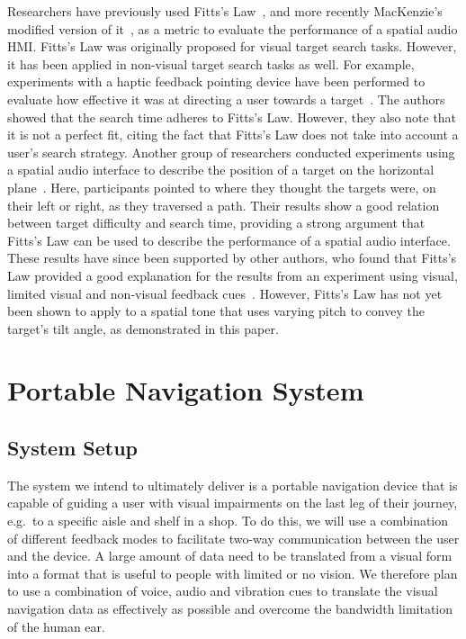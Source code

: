 \documentclass[sigconf, review=true, screen=true, anonymous=true]{acmart}
\begin{document}
Researchers have previously used Fitts's Law~\cite{fitts1954information}, and more recently MacKenzie's modified version of it~\cite{mackenzie1992fitts}, as a metric to evaluate the performance of a spatial audio HMI\@.
Fitts's Law was originally proposed for visual target search tasks.
However, it has been applied in non-visual target search tasks as well.
For example, experiments with a haptic feedback pointing device have been performed to evaluate how effective it was at directing a user towards a target~\cite{ahmaniemi2009augmented}.
The authors showed that the search time adheres to Fitts's Law.
However, they also note that it is not a perfect fit, citing the fact that Fitts's Law does not take into account a user's search strategy.
Another group of researchers conducted experiments using a spatial audio interface to describe the position of a target on the horizontal plane~\cite{marentakis2006effects}.
Here, participants pointed to where they thought the targets were, on their left or right, as they traversed a path.
Their results show a good relation between target difficulty and search time, providing a strong argument that Fitts's Law can be used to describe the performance of a spatial audio interface.
These results have since been supported by other authors, who found that Fitts's Law provided a good explanation for the results from an experiment using visual, limited visual and non-visual feedback cues~\cite{wu2010fitts}.
However, Fitts's Law has not yet been shown to apply to a spatial tone that uses varying pitch to convey the target's tilt angle, as demonstrated in this paper.

\section{Portable Navigation System}
\label{sec:portable-navigation}

\subsection{System Setup}

The system we intend to ultimately deliver is a portable navigation device that is capable of guiding a user with visual impairments on the last leg of their journey, e.g.\ to a specific aisle and shelf in a shop.
To do this, we will use a combination of different feedback modes to facilitate two-way communication between the user and the device.
A large amount of data need to be translated from a visual form into a format that is useful to people with limited or no vision.
We therefore plan to use a combination of voice, audio and vibration cues to translate the visual navigation data as effectively as possible and overcome the bandwidth limitation of the human ear. 
\end{document}
